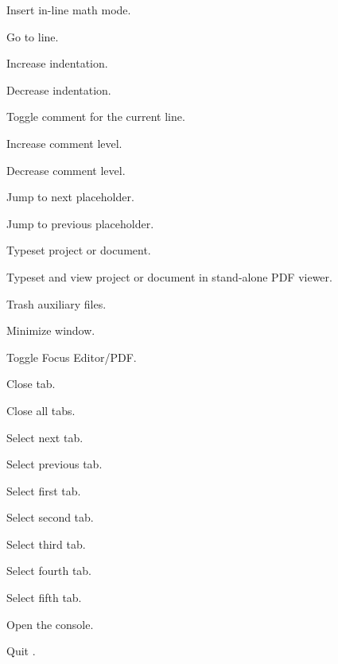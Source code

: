 \begin{description}
	\item[] Insert in-line math mode.
	\item[] Go to line.
	\item[\keys{\cmdkey + [}] Increase indentation.
	\item[\keys{\cmdkey + ]}] Decrease indentation.
	\item[\keys{\cmdkey + /}] Toggle comment for the current line.
	\item[\keys{\optkey + \cmdkey + /}] Increase comment level.
	\item[\keys{\ctlkey + \cmdkey + /}] Decrease comment level.
	\item[\keys{\cmdkey + \returnkey}] Jump to next placeholder.
	\item[\keys{\shiftkey + \cmdkey + \returnkey}] Jump to previous placeholder.
	\item[] Typeset project or document.
	\item[] Typeset and view project or document in stand-alone PDF viewer.
	\item[] Trash auxiliary files.
	\item[] Minimize window.
	\item[\keys{\optkey + \cmdkey + \tabkey}] Toggle Focus Editor/PDF{.}
	\item[] Close tab.
	\item[] Close all tabs.
	\item[\keys{\cmdkey + \}}] Select next tab.
	\item[\keys{\cmdkey + \{}] Select previous tab.
	\item[] Select first tab.
	\item[] Select second tab.
	\item[] Select third tab.
	\item[] Select fourth tab.
	\item[] Select fifth tab.
	\item[] Open the console.
	\item[] Quit \texnicle.\end{description}
